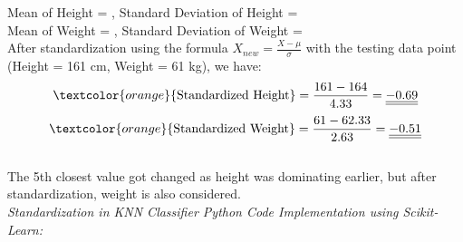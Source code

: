 \documentclass{book}
\begin{document}
Mean of Height = \uuline{164 cm}, Standard Deviation of Height = \uuline{4.33 cm}\\
Mean of Weight = , Standard Deviation of Weight = \\
\vspace{1mm}
After standardization using the formula \(X_{new} = \frac{X - \mu}{\sigma}\) with the testing data point (Height = 161 cm, Weight = 61 kg), we have:\\
\[
    \textcolor{orange}{\text{Standardized Height}} = \frac{161 - 164}{4.33} = \underline{\underline{-0.69}}
\]
\[
\textcolor{orange}{\text{Standardized Weight}} = \frac{61 - 62.33}{2.63} = \underline{\underline{-0.51}}
\]\\
\vspace{1mm}
The 5th closest value got changed as height was dominating earlier, but after standardization, weight is also considered.\\
\vspace{2mm}
\newpage
\textit{\large{Standardization in KNN Classifier Python Code Implementation using Scikit-Learn:}}
\end{document}
